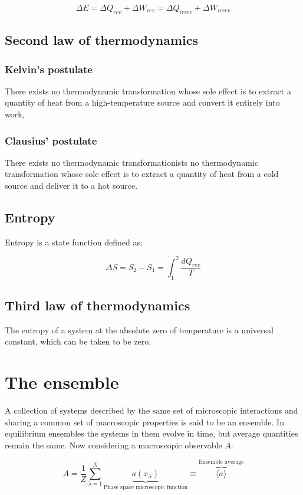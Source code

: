 	$$\Delta E = \Delta Q_{rev} + \Delta W_{rev} = \Delta Q_{irrev} + \Delta W_{irrev}$$

	\subsection{Second law of thermodynamics}

		\subsubsection{Kelvin's postulate}
		There exists no thermodynamic transformation whose sole effect is to extract a quantity of heat from a high-temperature source and convert it entirely into work,

		\subsubsection{Clausius' postulate}
		There exists no thermodynamic transformationists no thermodynamic transformation whose sole effect is to extract a quantity of heat from a cold source and deliver it to a hot source.

	\subsection{Entropy}
	Entropy is a state function defined as:

	$$\Delta S = S_2-S_1 = \int_1^2\frac{dQ_{rev}}{T}$$

	\subsection{Third law of thermodynamics}
	The entropy of a system at the absolute zero of temperature is a universal constant, which can be taken to be zero.

\section{The ensemble}
A collection of systems described by the same set of microscopic interactions and sharing a common set of macroscopic properties is said to be an ensemble.
In equilibrium ensembles the systems in them evolve in time, but average quantities remain the same.
Now considering a macroscopic observable $A$:

$$A = \frac{1}{Z}\sum\limits_{\lambda=1}^N\underbrace{a(x_\lambda)}_{\text{Phase space microscopic function}}\equiv\overbrace{\langle a\rangle}^{\text{Ensemble average}}$$

